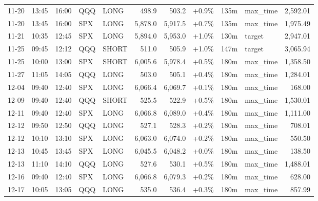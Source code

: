 \documentclass[11pt,a4paper,twoside]{article}
\begin{document}
\begin{center}
\begin{longtable}{>{\color{txtmain}}l l l l l r r r r >{\color{txtmain}}l r}
11-20 & 13:45 & 16:00 & QQQ & LONG & 498.9 & 503.2 & \textcolor{wingreen}{+0.9\%} & 135m & max\_time & \textcolor{wingreen}{2,592.01} \\
11-20 & 13:45 & 16:00 & SPX & LONG & 5,878.0 & 5,917.5 & \textcolor{wingreen}{+0.7\%} & 135m & max\_time & \textcolor{wingreen}{1,975.49} \\
11-21 & 10:35 & 12:45 & SPX & LONG & 5,894.0 & 5,953.0 & \textcolor{wingreen}{+1.0\%} & 130m & target & \textcolor{wingreen}{2,947.01} \\
11-25 & 09:45 & 12:12 & QQQ & SHORT & 511.0 & 505.9 & \textcolor{wingreen}{+1.0\%} & 147m & target & \textcolor{wingreen}{3,065.94} \\
11-25 & 10:00 & 13:00 & SPX & SHORT & 6,005.6 & 5,978.4 & \textcolor{wingreen}{+0.5\%} & 180m & max\_time & \textcolor{wingreen}{1,358.50} \\
11-27 & 11:05 & 14:05 & QQQ & LONG & 503.0 & 505.1 & \textcolor{wingreen}{+0.4\%} & 180m & max\_time & \textcolor{wingreen}{1,284.01} \\
12-04 & 09:40 & 12:40 & SPX & LONG & 6,066.4 & 6,069.7 & \textcolor{wingreen}{+0.1\%} & 180m & max\_time & \textcolor{wingreen}{168.00} \\
12-09 & 09:40 & 12:40 & QQQ & SHORT & 525.5 & 522.9 & \textcolor{wingreen}{+0.5\%} & 180m & max\_time & \textcolor{wingreen}{1,530.01} \\
12-11 & 09:40 & 12:40 & SPX & LONG & 6,066.8 & 6,089.0 & \textcolor{wingreen}{+0.4\%} & 180m & max\_time & \textcolor{wingreen}{1,111.00} \\
12-12 & 09:50 & 12:50 & QQQ & LONG & 527.1 & 528.3 & \textcolor{wingreen}{+0.2\%} & 180m & max\_time & \textcolor{wingreen}{708.01} \\
12-12 & 10:10 & 13:10 & SPX & LONG & 6,063.0 & 6,074.0 & \textcolor{wingreen}{+0.2\%} & 180m & max\_time & \textcolor{wingreen}{550.50} \\
12-13 & 10:45 & 13:45 & SPX & LONG & 6,045.5 & 6,048.2 & \textcolor{wingreen}{+0.0\%} & 180m & max\_time & \textcolor{wingreen}{138.50} \\
12-13 & 11:10 & 14:10 & QQQ & LONG & 527.6 & 530.1 & \textcolor{wingreen}{+0.5\%} & 180m & max\_time & \textcolor{wingreen}{1,488.01} \\
12-16 & 09:40 & 12:40 & SPX & LONG & 6,066.8 & 6,079.3 & \textcolor{wingreen}{+0.2\%} & 180m & max\_time & \textcolor{wingreen}{628.00} \\
12-17 & 10:05 & 13:05 & QQQ & LONG & 535.0 & 536.4 & \textcolor{wingreen}{+0.3\%} & 180m & max\_time & \textcolor{wingreen}{857.99} \\

\end{longtable}
\end{center}
\end{document}
